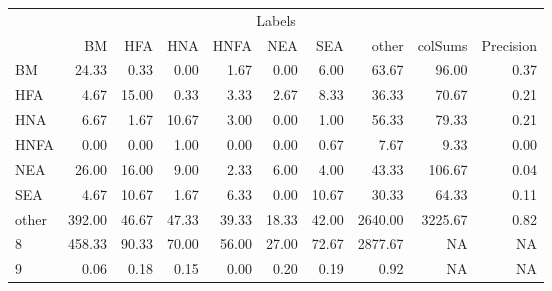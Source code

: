 \begin{table}
\centering\begingroup\fontsize{11}{13}\selectfont

\begin{tabular}{lrrrrrr>{}r|rr}
\toprule
\multicolumn{10}{c}{Labels} \\
\cmidrule(l{3pt}r{3pt}){1-10}
  & BM & HFA & HNA & HNFA & NEA & SEA & other & colSums & Precision\\
\midrule
BM & 24.33 & 0.33 & 0.00 & 1.67 & 0.00 & 6.00 & 63.67 & 96.00 & 0.37\\
HFA & 4.67 & 15.00 & 0.33 & 3.33 & 2.67 & 8.33 & 36.33 & 70.67 & 0.21\\
HNA & 6.67 & 1.67 & 10.67 & 3.00 & 0.00 & 1.00 & 56.33 & 79.33 & 0.21\\
HNFA & 0.00 & 0.00 & 1.00 & 0.00 & 0.00 & 0.67 & 7.67 & 9.33 & 0.00\\
NEA & 26.00 & 16.00 & 9.00 & 2.33 & 6.00 & 4.00 & 43.33 & 106.67 & 0.04\\
\addlinespace
SEA & 4.67 & 10.67 & 1.67 & 6.33 & 0.00 & 10.67 & 30.33 & 64.33 & 0.11\\
other & 392.00 & 46.67 & 47.33 & 39.33 & 18.33 & 42.00 & 2640.00 & 3225.67 & 0.82\\
8 & 458.33 & 90.33 & 70.00 & 56.00 & 27.00 & 72.67 & 2877.67 & NA & NA\\
9 & 0.06 & 0.18 & 0.15 & 0.00 & 0.20 & 0.19 & 0.92 & NA & NA\\
\bottomrule
\end{tabular}
\endgroup{}
\end{table}

